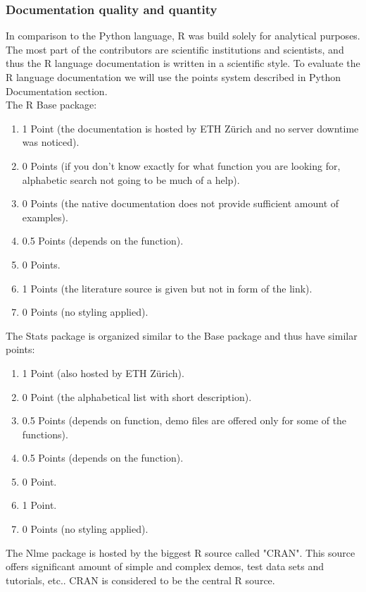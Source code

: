 \documentclass{article}
\begin{document}
\subsubsection{Documentation quality and quantity}
In comparison to the Python language, R was build solely for analytical purposes. The most part of the contributors are scientific institutions and scientists, and thus the R language documentation is written in a scientific style. To evaluate the R language documentation we will use the points system described in Python Documentation section.\\
The R Base package:
\begin{enumerate}
    \item 1 Point (the documentation is hosted by ETH Zürich and no server downtime was noticed).
    \item 0 Points (if you don't know exactly for what function you are looking for, alphabetic search not going to be much of a help).
    \item 0 Points (the native documentation does not provide sufficient amount of examples).
    \item 0.5 Points (depends on the function).
    \item 0 Points.
    \item 1 Points (the literature source is given but not in form of the link).
    \item 0 Points (no styling applied).
\end{enumerate}
The Stats package is organized similar to the Base package and thus have similar points:
\begin{enumerate}
    \item 1 Point (also hosted by ETH Zürich).
    \item 0 Point (the alphabetical list with short description).
    \item 0.5 Points (depends on function, demo files are offered only for some of the functions).
    \item 0.5 Points (depends on the function).
    \item 0 Point.
    \item 1 Point.
    \item 0 Points (no styling applied).
\end{enumerate} 
The Nlme package is hosted by the biggest R source called "CRAN". This source offers significant amount of simple and complex demos, test data sets and tutorials, etc.. CRAN is considered to be the central R source.
\end{document}
